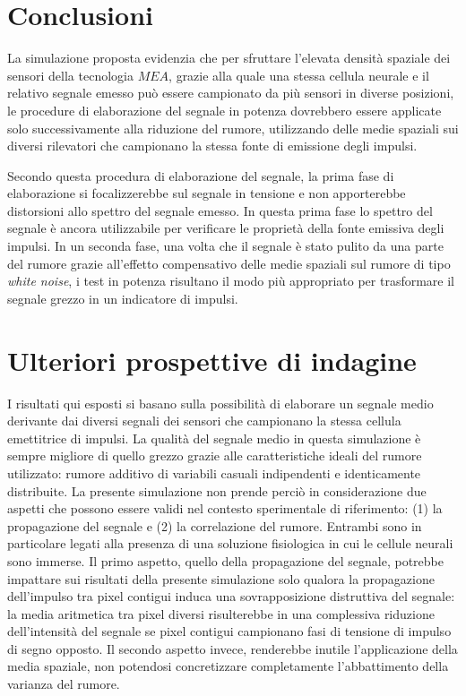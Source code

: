\section{Conclusioni}
La simulazione proposta evidenzia che per sfruttare l'elevata densità spaziale dei sensori 
della tecnologia $MEA$, grazie alla quale una stessa cellula neurale e il relativo segnale emesso può essere campionato da più sensori in diverse posizioni, le procedure di elaborazione del segnale in potenza dovrebbero essere applicate solo successivamente alla riduzione del rumore, utilizzando delle medie spaziali sui diversi rilevatori che campionano la stessa fonte di emissione degli impulsi.

Secondo questa procedura di elaborazione del segnale, la prima fase di elaborazione si focalizzerebbe sul segnale in tensione e non apporterebbe distorsioni allo spettro del segnale emesso. In questa prima fase lo spettro del segnale è ancora utilizzabile per verificare le proprietà della fonte emissiva degli impulsi. In un seconda fase, una volta che il segnale è stato pulito da una parte del rumore grazie all'effetto compensativo delle medie spaziali sul rumore di tipo {\it white noise}, i test in potenza risultano il modo più appropriato per trasformare il segnale grezzo in un indicatore di impulsi.


\section{Ulteriori prospettive di indagine}
I risultati qui esposti si basano sulla possibilità di elaborare un segnale medio derivante dai diversi segnali dei sensori che campionano la stessa cellula emettitrice di impulsi. La qualità del segnale medio in questa simulazione è sempre migliore di quello grezzo grazie alle caratteristiche ideali del rumore utilizzato: rumore additivo di variabili casuali indipendenti e identicamente distribuite. 
La presente simulazione non prende perciò in considerazione due aspetti che possono essere validi nel contesto sperimentale di riferimento: (1) la propagazione del segnale e (2) la correlazione del rumore. Entrambi sono in particolare  legati alla presenza di una soluzione fisiologica in cui le cellule neurali sono immerse. Il primo aspetto, quello della propagazione del segnale, potrebbe impattare sui risultati della presente simulazione solo qualora la propagazione dell'impulso tra pixel contigui induca una sovrapposizione distruttiva del segnale: la media aritmetica tra pixel diversi risulterebbe in una complessiva riduzione dell'intensità del segnale se pixel contigui campionano fasi di tensione di impulso di segno opposto. Il secondo aspetto invece, renderebbe inutile l'applicazione della media spaziale, non potendosi concretizzare completamente l'abbattimento della varianza del rumore.



